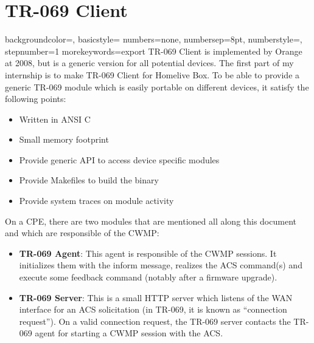 
\chapter{TR-069 Client} %

\label{Chapter5} %


{
    backgroundcolor=\color{black},
    basicstyle=\scriptsize\color{white}\ttfamily
    numbers=none,
    numbersep=8pt,                   %
    numberstyle=\tiny\color{white}, %
    stepnumber=1                    %
}
{
  morekeywords={export}
}
TR-069 Client is implemented by Orange at 2008, but is a generic version for all potential devices. The first part of my internship is to make TR-069 Client for Homelive Box. To be able to provide a generic TR-069 module which is easily portable on different devices, it satisfy the following points:

\begin{itemize}
  \item Written in ANSI C
  \item Small memory footprint
  \item Provide generic API to access device specific modules
  \item Provide Makefiles to build the binary
  \item Provide system traces on module activity
\end{itemize}

On a CPE, there are two modules that are mentioned all along this document and which are responsible of
the CWMP:
\begin{itemize}
  \item \textbf{TR-069 Agent}: This agent is responsible of the CWMP sessions. It initializes them with the inform message, realizes the ACS command(s) and execute some feedback command (notably after a firmware upgrade).
  \item \textbf{TR-069 Server}: This is a small HTTP server which listens of the WAN interface for an ACS solicitation (in TR-069, it is known as “connection request”). On a valid connection request, the TR-069 server contacts the TR-069 agent for starting a CWMP session with the ACS.
\end{itemize}

